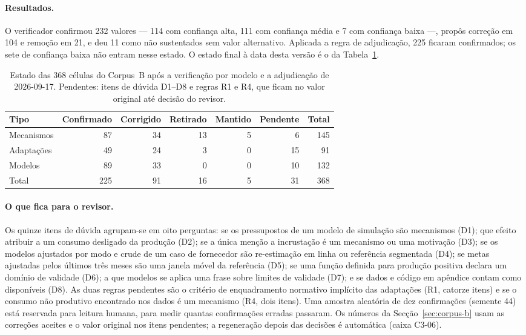 \paragraph{Resultados.} O verificador confirmou 232 valores --- 114 com
confiança alta, 111 com confiança média e 7 com confiança baixa ---, propôs
correção em 104 e remoção em 21, e deu 11 como não sustentados sem valor
alternativo. Aplicada a regra de adjudicação, 225 ficaram confirmados; os sete
de confiança baixa não entram nesse estado. O estado final à data desta versão
é o da Tabela~\ref{tab:apB-verificacao}.

\begin{table}[htbp]
  \centering\small
  \caption[Estado das células do Corpus B após a verificação por
  modelo]{Estado das 368 células do Corpus~B após a verificação por modelo e
  a adjudicação de 2026-09-17. Pendentes: itens de dúvida D1--D8 e regras R1
  e R4, que ficam no valor original até decisão do revisor.}
  \label{tab:apB-verificacao}
  \begin{tabular}{lrrrrrr}
    \toprule
    Tipo & Confirmado & Corrigido & Retirado & Mantido & Pendente & Total \\
    \midrule
    Mecanismos  & 87  & 34 & 13 & 5 & 6  & 145 \\
    Adaptações  & 49  & 24 & 3  & 0 & 15 & 91 \\
    Modelos     & 89  & 33 & 0  & 0 & 10 & 132 \\
    \midrule
    Total       & 225 & 91 & 16 & 5 & 31 & 368 \\
    \bottomrule
  \end{tabular}
\end{table}

\paragraph{O que fica para o revisor.} Os quinze itens de dúvida agrupam-se em
oito perguntas: se os pressupostos de um modelo de simulação são mecanismos
(D1); que efeito atribuir a um consumo desligado da produção (D2); se a única
menção a incrustação é um mecanismo ou uma motivação (D3); se os modelos
ajustados por modo e crude de um caso de fornecedor são re-estimação em linha
ou referência segmentada (D4); se metas ajustadas pelos últimos três meses
são uma janela móvel da referência (D5); se uma função definida para
produção positiva declara um domínio de validade (D6); a que modelos se
aplica uma frase sobre limites de validade (D7); e se dados e código em
apêndice contam como disponíveis (D8). As duas regras pendentes são o
critério de enquadramento normativo implícito das adaptações (R1, catorze
itens) e se o consumo não produtivo encontrado nos dados é um mecanismo (R4,
dois itens). Uma amostra aleatória de dez confirmações (semente 44) está
reservada para leitura humana, para medir quantas confirmações erradas
passaram. Os números da Secção~\ref{sec:corpus-b} usam as correções aceites e
o valor original nos itens pendentes; a regeneração depois das decisões é
automática (caixa C3-06).

